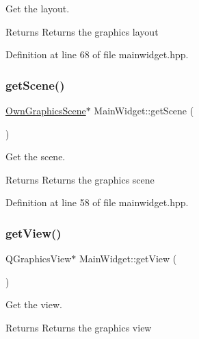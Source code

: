 Get the layout. 

\begin{DoxyReturn}{Returns}
Returns the graphics layout 
\end{DoxyReturn}


Definition at line 68 of file mainwidget.\+hpp.

\mbox{\label{classMainWidget_ad40a8bd13b501a0ebe88c87426a5b591}} 
\subsubsection{\texorpdfstring{get\+Scene()}{getScene()}}
{\footnotesize\ttfamily \mbox{\hyperlink{classOwnGraphicsScene}{Own\+Graphics\+Scene}}$\ast$ Main\+Widget\+::get\+Scene (\begin{DoxyParamCaption}{ }\end{DoxyParamCaption})\hspace{0.3cm}{\ttfamily [inline]}}



Get the scene. 

\begin{DoxyReturn}{Returns}
Returns the graphics scene 
\end{DoxyReturn}


Definition at line 58 of file mainwidget.\+hpp.

\mbox{\label{classMainWidget_ae73e3dac6fb1e99dabe84aab683b3fbd}} 
\subsubsection{\texorpdfstring{get\+View()}{getView()}}
{\footnotesize\ttfamily Q\+Graphics\+View$\ast$ Main\+Widget\+::get\+View (\begin{DoxyParamCaption}{ }\end{DoxyParamCaption})\hspace{0.3cm}{\ttfamily [inline]}}



Get the view. 

\begin{DoxyReturn}{Returns}
Returns the graphics view 
\end{DoxyReturn}


